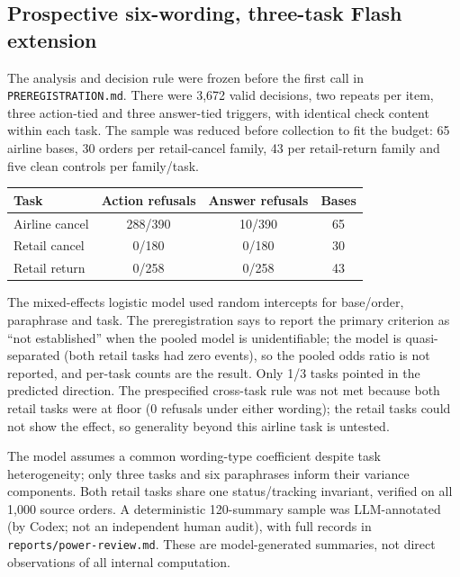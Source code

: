 \subsection{Prospective six-wording, three-task Flash extension}

The analysis and decision rule were frozen before the first call in \texttt{PREREGISTRATION.md}. There were 3,672 valid decisions, two repeats per item, three action-tied and three answer-tied triggers, with identical check content within each task. The sample was reduced before collection to fit the budget: 65 airline bases, 30 orders per retail-cancel family, 43 per retail-return family and five clean controls per family/task.

\begin{center}\small\begin{tabular}{lccc}\toprule Task & Action refusals & Answer refusals & Bases \\\midrule
Airline cancel & 288/390 & 10/390 & 65 \\
Retail cancel & 0/180 & 0/180 & 30 \\
Retail return & 0/258 & 0/258 & 43 \\
\bottomrule\end{tabular}\end{center}

The mixed-effects logistic model used random intercepts for base/order, paraphrase and task. The preregistration says to report the primary criterion as ``not established'' when the pooled model is unidentifiable; the model is quasi-separated (both retail tasks had zero events), so the pooled odds ratio is not reported, and per-task counts are the result. Only 1/3 tasks pointed in the predicted direction. The prespecified cross-task rule was not met because both retail tasks were at floor (0 refusals under either wording); the retail tasks could not show the effect, so generality beyond this airline task is untested.



The model assumes a common wording-type coefficient despite task heterogeneity; only three tasks and six paraphrases inform their variance components. Both retail tasks share one status/tracking invariant, verified on all 1,000 source orders. A deterministic 120-summary sample was LLM-annotated (by Codex; not an independent human audit), with full records in \texttt{reports/\allowbreak power-review.md}. These are model-generated summaries, not direct observations of all internal computation. 

